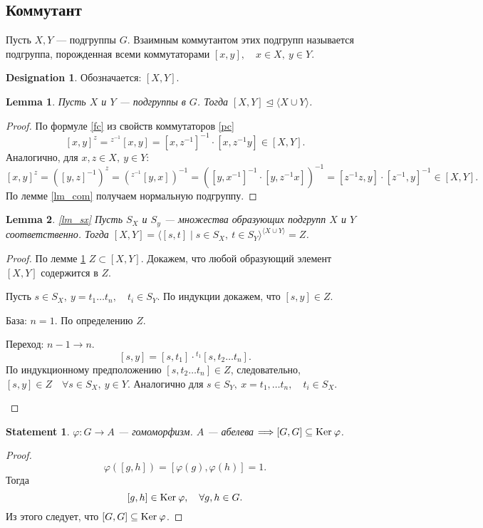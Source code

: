 \documentclass[11pt]{book}
\renewcommand{\ker}{{\mathop{\text{\rm Ker}}}\:}
\theoremstyle{definition}
\theoremstyle{plain}
\theoremstyle{plain}
\newtheorem{lm}{Lemma}
\newtheorem{st}{Statement}
\theoremstyle{definition}
\newtheorem*{name}{Designation}
\theoremstyle{remark}
\begin{document}
\subsection{Коммутант}
\begin{defn}
    Пусть $ X, Y $ --- подгруппы  $ G$. {\sf Взаимным коммутантом} этих подгрупп называется подгруппа, порожденная всеми коммутаторами  $ [x, y], \quad x \in X, ~ y \in Y$.
    \begin{name}
	Обозначается:  $ [X, Y]$.
    \end{name}
\end{defn}
\begin{lm}\label{lm_tri}
    Пусть $ X$ и  $ Y$ --- подгруппы в  $ G$. Тогда  $ [X, Y] \trianglelefteq \langle X \cup Y \rangle$.
\end{lm}
\begin{proof}
    По формуле \ref{fc} из свойств коммутаторов \ref{pc}
    \[
	[x, y]^{z } = {^{z^{-1}}\![x, y] } = [x, z ^{-1}]^{-1} \cdot [x , z^{-1}y] \in [X, Y]
    .\]
    Аналогично, для  $ x, z \in X, ~ y \in Y$:
    \[
	[x, y]^{z} = \left( [y, z]^{-1} \right) ^{z} = \left( {^{z^{-1}}[y, x]} \right)^{-1} = \left( [y, x^{-1}]^{-1} \cdot [y, z^{-1}x] \right)^{-1} = [z^{-1}z, y] \cdot [z^{-1}, y]^{-1} \in [X, Y]
    .\]
    По лемме \ref{lm_com} получаем нормальную подгруппу.
\end{proof}
\begin{lm}\ref{lm_sx}
    Пусть  $ S_{X}$ и $ S_{y}$ --- множества образующих подгрупп $ X$ и  $ Y$ соответственно. Тогда  $ [X, Y] = \langle [s, t] \mid s \in S_X , ~ t \in S_Y \rangle ^{\langle X \cup Y \rangle} = Z$.
\end{lm}
\begin{proof}
    По лемме \ref{lm_tri}  $ Z \subset [X, Y]$. Докажем, что любой образующий элемент $ [X, Y]$ содержится в  $ Z$.

    Пусть  $ s \in S_X, ~ y = t_1 \ldots t_n, \quad t_i \in S_Y$. По индукции докажем, что $ [s, y] \in Z$.
    \begin{description}[noitemsep]
	\item База: $ n = 1$. По определению  $ Z$.
	\item  Переход:  $ n - 1 \to  n$. \[
		[s, y] = [s, t_1]\cdot {\!\!^{t_1} [s, t_2 \ldots t_n]}
	    .\]
	    По индукционному предположению $ [s, t_2 \ldots t_n] \in Z$, следовательно, $ [s, y] \in Z \quad \forall s \in S_X, ~ y \in  Y$. Аналогично для $ s \in S_Y, ~ x = t_1, \ldots t_n, \quad t_i \in S_X$.
    \end{description}
\end{proof}
\begin{st}
    $\varphi : G \to  A$ --- гомоморфизм.
    $A$ --- абелева $\Longrightarrow [G, G] \subseteq \ker \varphi $.
\end{st}
\begin{proof}
    \[
	\varphi ([g, h]) = [\varphi (g), \varphi (h)] = 1
    .\]
    Тогда \[
	[g, h] \in  \ker \varphi , \quad \forall g, h \in  G
    .\]
    Из этого следует, что $[G, G] \subseteq  \ker \varphi $.
\end{proof}
\end{document}
